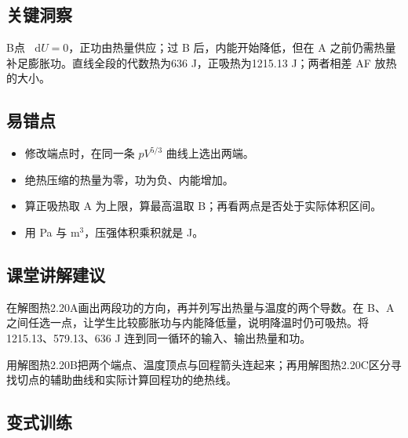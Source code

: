 \documentclass[UTF8,fontset=fandol,a4paper,11pt]{ctexart}
\newcommand{\dd}{\mathop{}\!\mathrm{d}}
\begin{document}


\subsection*{关键洞察}

B点 $\dd U=0$，正功由热量供应；过 B 后，内能开始降低，但在 A 之前仍需热量补足膨胀功。直线全段的代数热为636 J，正吸热为1215.13 J；两者相差 AF 放热的大小。



\subsection*{易错点}

\begin{itemize}
\item 修改端点时，在同一条 $pV^{5/3}$ 曲线上选出两端。
\item 绝热压缩的热量为零，功为负、内能增加。
\item 算正吸热取 A 为上限，算最高温取 B；再看两点是否处于实际体积区间。
\item 用 Pa 与 m$^3$，压强体积乘积就是 J。
\end{itemize}



\subsection*{课堂讲解建议}

在解图热2.20A画出两段功的方向，再并列写出热量与温度的两个导数。在 B、A 之间任选一点，让学生比较膨胀功与内能降低量，说明降温时仍可吸热。将 1215.13、579.13、636 J 连到同一循环的输入、输出热量和功。

用解图热2.20B把两个端点、温度顶点与回程箭头连起来；再用解图热2.20C区分寻找切点的辅助曲线和实际计算回程功的绝热线。



\subsection*{变式训练}
\end{document}
